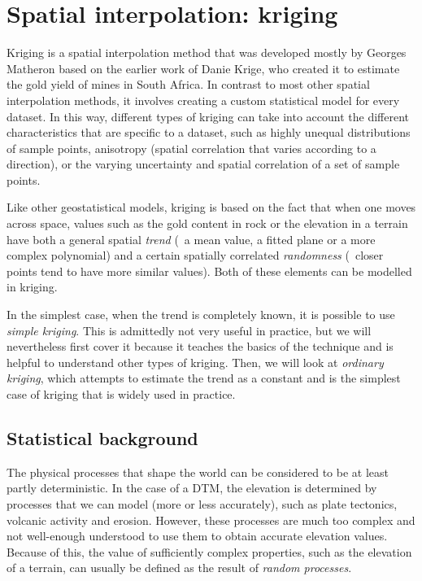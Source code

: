
\setchapterpreamble[u]{\margintoc}


\graphicspath{{kriging/}}

\chapter{Spatial interpolation: kriging}%
\label{chap:kriging}


Kriging is a spatial interpolation method that was developed mostly by Georges Matheron based on the earlier work of Danie Krige, who created it to estimate the gold yield of mines in South Africa.
In contrast to most other spatial interpolation methods, it involves creating a custom statistical model for every dataset.
In this way, different types of kriging can take into account the different characteristics that are specific to a dataset, such as highly unequal distributions of sample points, anisotropy (spatial correlation that varies according to a direction), or the varying uncertainty and spatial correlation of a set of sample points.

Like other geostatistical models, kriging is based on the fact that when one moves across space, values such as the gold content in rock or the elevation in a terrain have both a general spatial \emph{trend} (\eg\ a mean value, a fitted plane or a more complex polynomial) and a certain spatially correlated \emph{randomness} (\ie\ closer points tend to have more similar values).
Both of these elements can be modelled in kriging.

In the simplest case, when the trend is completely known, it is possible to use \emph{simple kriging}.
This is admittedly not very useful in practice, but we will nevertheless first cover it because it teaches the basics of the technique and is helpful to understand other types of kriging.
Then, we will look at \emph{ordinary kriging}, which attempts to estimate the trend as a constant and is the simplest case of kriging that is widely used in practice.

\section{Statistical background}

The physical processes that shape the world can be considered to be at least partly deterministic.
In the case of a DTM, the elevation is determined by processes that we can model (more or less accurately), such as plate tectonics, volcanic activity and erosion.
However, these processes are much too complex and not well-enough understood to use them to obtain accurate elevation values.
Because of this, the value of sufficiently complex properties, such as the elevation of a terrain, can usually be defined as the result of \emph{random processes}.

